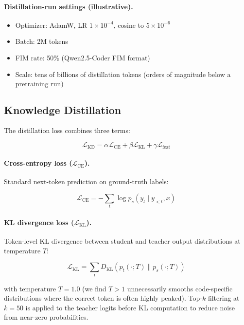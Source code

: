 \documentclass[11pt,a4paper]{article}
\begin{document}
\paragraph{Distillation-run settings (illustrative).}
\begin{itemize}
  \item Optimizer: AdamW, LR $1 \times 10^{-4}$, cosine to $5 \times 10^{-6}$
  \item Batch: 2M tokens
  \item FIM rate: 50\% (Qwen2.5-Coder FIM format)
  \item Scale: tens of billions of distillation tokens (orders of magnitude below a pretraining run)
\end{itemize}

\subsection{Knowledge Distillation}

The distillation loss combines three terms:

\begin{equation}
  \mathcal{L}_{\text{KD}} = \alpha \mathcal{L}_{\text{CE}} + \beta \mathcal{L}_{\text{KL}} + \gamma \mathcal{L}_{\text{feat}}
\end{equation}

\paragraph{Cross-entropy loss ($\mathcal{L}_{\text{CE}}$).}
Standard next-token prediction on ground-truth labels:

\begin{equation}
  \mathcal{L}_{\text{CE}} = -\sum_t \log p_s(y_t \mid y_{<t}, x)
\end{equation}

\paragraph{KL divergence loss ($\mathcal{L}_{\text{KL}}$).}
Token-level KL divergence between student and teacher output distributions at temperature $T$:

\begin{equation}
  \mathcal{L}_{\text{KL}} = \sum_t D_{\text{KL}}\!\left(p_t\!\left(\cdot; T\right) \| p_s\!\left(\cdot; T\right)\right)
\end{equation}

with temperature $T = 1.0$ (we find $T > 1$ unnecessarily smooths code-specific distributions
where the correct token is often highly peaked). Top-$k$ filtering at $k=50$ is applied to
the teacher logits before KL computation to reduce noise from near-zero probabilities.
\end{document}

